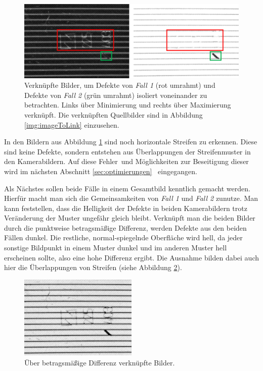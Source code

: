 \begin{figure}[H]
	\centering
	\includegraphics[width=\textwidth]{03_sichtpruefungDurchLichtstreuung/einsatzVonMehrerenStreifenmustern/figures/minAndMaxLink}
	\caption[Verknüpfte Bilder über Minimierung und Maximierung]{Verknüpfte Bilder, um Defekte von \textit{Fall 1} (rot umrahmt) und Defekte von \textit{Fall 2} (grün umrahmt) isoliert voneinander zu betrachten. Links über Minimierung und rechts über Maximierung verknüpft. Die verknüpften Quellbilder sind in Abbildung \ref{img:imageToLink} einzusehen.}
	\label{img:minAndMaxLink}
\end{figure}

\noindent
In den Bildern aus Abbildung \ref{img:minAndMaxLink} sind noch horizontale Streifen zu erkennen.
Diese sind keine Defekte, sondern entstehen aus Überlappungen der Streifenmuster in den Kamerabildern.
Auf diese \glqq Fehler\grqq ~und Möglichkeiten zur Beseitigung dieser wird im nächsten Abschnitt \ref{sec:optimierungen} ~eingegangen.

\p
Als Nächstes sollen beide Fälle in einem Gesamtbild kenntlich gemacht werden.
Hierfür macht man sich die Gemeinsamkeiten von \textit{Fall 1} und \textit{Fall 2} zunutze.
Man kann feststellen, dass die Helligkeit der Defekte in beiden Kamerabildern trotz Veränderung der Muster ungefähr gleich bleibt.
Verknüpft man die beiden Bilder durch die punktweise betragsmäßige Differenz, werden Defekte aus den beiden Fällen dunkel.
Die restliche, normal-spiegelnde Oberfläche wird hell, da jeder sonstige Bildpunkt in einem Muster dunkel und im anderen Muster hell erscheinen sollte, also eine hohe Differenz ergibt.
Die Ausnahme bilden dabei auch hier die Überlappungen von Streifen (siehe Abbildung \ref{img:diffImage}).

\begin{figure}[H]
	\centering
	\includegraphics[width=0.5\textwidth]{03_sichtpruefungDurchLichtstreuung/einsatzVonMehrerenStreifenmustern/figures/diffImage}
	\caption[Verknüpfte Bilder über Differenz]{Über betragsmäßige Differenz verknüpfte Bilder.}
	\label{img:diffImage}
\end{figure}